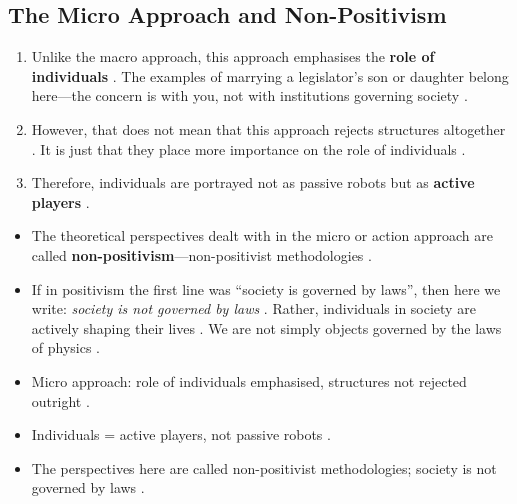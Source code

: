 \subsection{The Micro Approach and Non-Positivism}
\begin{enumerate}
    \item Unlike the macro approach, this approach emphasises the \textbf{role of individuals} . The examples of marrying a legislator's son or daughter belong here---the concern is with you, not with institutions governing society .
    \item However, that does not mean that this approach rejects structures altogether . It is just that they place more importance on the role of individuals .
    \item Therefore, individuals are portrayed not as passive robots but as \textbf{active players} .
\end{enumerate}

\begin{KeyConcept}
\begin{itemize}
    \item The theoretical perspectives dealt with in the micro or action approach are called \textbf{non-positivism}---non-positivist methodologies .
    \item If in positivism the first line was ``society is governed by laws'', then here we write: \textit{society is not governed by laws} . Rather, individuals in society are actively shaping their lives . We are not simply objects governed by the laws of physics .
\end{itemize}
\end{KeyConcept}

\begin{QuickRevision}
\begin{itemize}
    \item Micro approach: role of individuals emphasised, structures not rejected outright .
    \item Individuals = active players, not passive robots .
    \item The perspectives here are called non-positivist methodologies; society is not governed by laws .
\end{itemize}
\end{QuickRevision}

